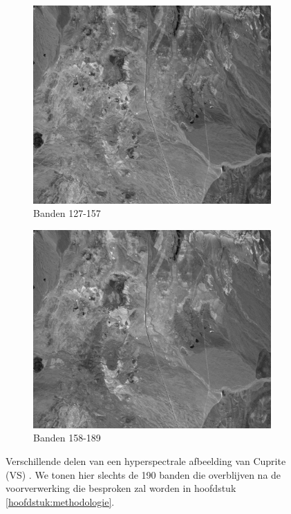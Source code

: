 \begin{figure}[H]
\begin{subfigure}{0.48\textwidth}
  \includegraphics[width=0.95\linewidth]{images/cuprite_bands_127-158.png}
  \caption{Banden 127-157}
\end{subfigure}
\begin{subfigure}{0.48\textwidth}
  \centering
  \includegraphics[width=0.95\linewidth]{images/cuprite_bands_158-190.png}
  \caption{Banden 158-189}
\end{subfigure}
\caption{Verschillende delen van een hyperspectrale afbeelding van Cuprite (VS) \cite{ref:ehu_aviris_cuprite}. We tonen hier slechts de 190 banden die overblijven na de voorverwerking die besproken zal worden in hoofdstuk \ref{hoofdstuk:methodologie}.}
\label{fig:cuprite-bands}
\end{figure}
\newpage

